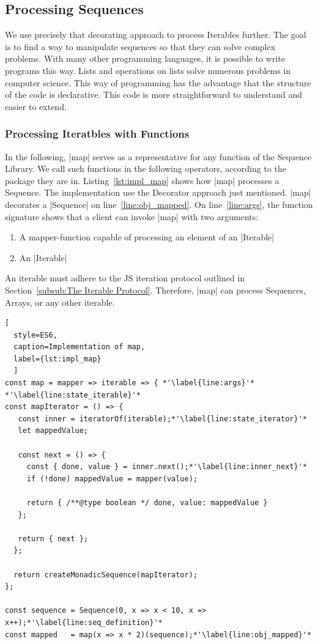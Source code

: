 \subsection{Processing Sequences}
\label{sec:Processing Sequences}
We use precisely that decorating approach to process Iterables further. 
The goal is to find a way to manipulate sequences so that they can solve 
complex problems. With many other programming languages, it is possible to write 
programs this way. Lists and operations on lists solve numerous problems in 
computer science. This way of programming has the advantage that the structure 
of the code is declarative. This code is more straightforward to understand 
and easier to extend.

\subsubsection{Processing Iteratbles with Functions}
\label{subsub:Processing Iterables with Functions}
In the following, |map| serves as a representative for any function of the
Sequence Library. We call such functions in the following operators,
according to the package they are in.
Listing~\ref{lst:impl_map} shows how |map| processes a Sequence. The 
implementation use the Decorator approach just mentioned. |map| decorates a
|Sequence| on line~\ref{line:obj_mapped}.
\newline
On line~\ref{line:args}, the function signature shows that a client can invoke 
|map| with two arguments:

\begin{enumerate}
  \item{A mapper-function capable of processing an element of an |Iterable|}
  \item{An |Iterable|}
\end{enumerate}

An iterable must adhere to the JS iteration protocol 
outlined in Section~\ref{subsub:The Iterable Protocol}. Therefore, |map| can 
process Sequences, Arrays, or any other iterable. 

\begin{lstlisting}[
  style=ES6, 
  caption=Implementation of map,
  label={lst:impl_map}
  ]
const map = mapper => iterable => { *'\label{line:args}'*
*'\label{line:state_iterable}'*
const mapIterator = () => {
   const inner = iteratorOf(iterable);*'\label{line:state_iterator}'*
   let mappedValue;
 
   const next = () => {
     const { done, value } = inner.next();*'\label{line:inner_next}'*
     if (!done) mappedValue = mapper(value);
 
     return { /**@type boolean */ done, value: mappedValue }
   };
 
   return { next };
  };
 
  return createMonadicSequence(mapIterator);
};

const sequence = Sequence(0, x => x < 10, x => x++);*'\label{line:seq_definition}'*
const mapped   = map(x => x * 2)(sequence);*'\label{line:obj_mapped}'*
\end{lstlisting}

